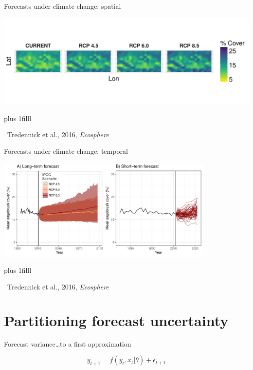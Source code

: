 \documentclass[14pt, compress, aspectratio=1610]{beamer}
\newcommand{\btVFill}{\vskip0pt plus 1filll}
\newcommand{\credit}[1]{\btVFill\par\hfill \footnotesize ~#1}
\begin{document}
\begin{frame}{%
\protect\hypertarget{forecasts-under-climate-change-spatial-1}{%
Forecasts under climate change: spatial}}

\includegraphics[width=\textwidth]{./figures/clim_change_mean_spatial.pdf}

\credit{Tredennick et al., 2016, \emph{Ecosphere}}

\end{frame}

\begin{frame}{%
\protect\hypertarget{forecasts-under-climate-change-temporal}{%
Forecasts under climate change: temporal}}

\centering

\includegraphics[height=2in]{./figures/temporal_forecasts_presentation.pdf}

\credit{Tredennick et al., 2016, \emph{Ecosphere}}

\end{frame}

\hypertarget{partitioning-forecast-uncertainty}{%
\section{Partitioning forecast
uncertainty}\label{partitioning-forecast-uncertainty}}

\begin{frame}{%
\protect\hypertarget{forecast-varianceto-a-first-approximation}{%
Forecast variance\ldots{}to a first approximation}}

\[
y_{t+1} = f(y_t, x_t|\theta) + \epsilon_{t+1}
\]

\end{frame}
\end{document}
